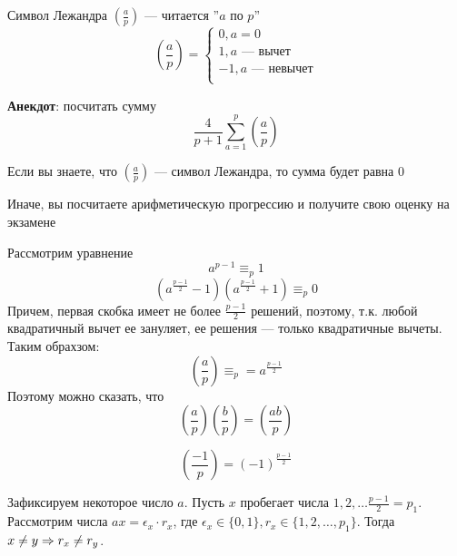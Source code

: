 \begin{definition}
    Символ Лежандра \(\left(\frac{a}{p}\right)\) --- читается ''\(a\) по \(p\)''
    \[
    \left(\frac{a}{p}\right) = \left\{\begin{array}{l}
        0, a = 0 \\
        1, a\text{ --- вычет} \\
        -1, a\text{ --- невычет} \\
    \end{array}\right.
    \]
\end{definition}

\textbf{Анекдот}: посчитать сумму 
\[\frac{4}{p + 1}\sum_{a = 1}^p\left(\frac{a}{p}\right)\]
\begin{solution}[1]
    Если вы знаете, что \(\left(\frac{a}{p}\right)\) --- символ Лежандра, то сумма будет равна 0
\end{solution}
\begin{solution}[2]
    Иначе, вы посчитаете арифметическую прогрессию и получите свою оценку на экзамене
\end{solution}

Рассмотрим уравнение
\[a^{p-1} \equiv_p 1\]
\[\left(a^{\frac{p-1}{2}} - 1\right)\left(a^{\frac{p-1}{2}} + 1\right)  \equiv_p 0\]
Причем, первая скобка имеет не более \(\frac{p-1}{2}\) решений, поэтому, т.к. любой квадратичный вычет ее зануляет, ее решения --- только квадратичные вычеты. Таким обрахзом:
\[\left(\frac{a}{p}\right) \equiv_p = a^{\frac{p-1}{2}}\]
Поэтому можно сказать, что 
\[\left(\frac{a}{p}\right)\left(\frac{b}{p}\right) = \left(\frac{ab}{p}\right)\]
\begin{note}
    \[\left(\frac{-1}{p}\right) = (-1)^\frac{p-1}{2}\]
\end{note}

\begin{proposition}
    Зафиксируем некоторое число \(a\). Пусть \(x\) пробегает числа \(1, 2, \dots \frac{p-1}{2} = p_1\). Рассмотрим числа \(ax = \epsilon_x\cdot r_x\), где \(\epsilon_x \in \{0, 1\}, r_x \in \{1, 2, \dots, p_1\}\). Тогда \(x \ne y \Rightarrow r_x \ne r_y\).
\end{proposition}